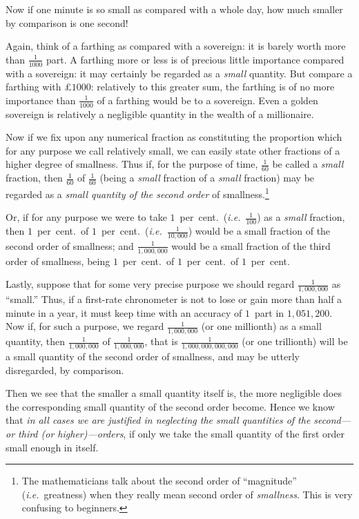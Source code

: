 \documentclass[12pt]{book}[2005/09/16]
\newcommand{\DPPageSep}[2]{\Pagelabel{#2}}
\newcommand{\Pagelabel}[1]
  {\phantomsection\label{#1}}
\newcommand{\IE}{\textit{i.e.}}
\begin{document}
Now if one minute is so small as compared with a
whole day, how much smaller by comparison is one
second!

Again, think of a farthing as compared with a
sovereign: it is barely worth more than $\frac{1}{1000}$ part.
A farthing more or less is of precious little importance
compared with a sovereign: it may certainly be regarded
as a \emph{small} quantity. But compare a farthing
with £$1000$: relatively to this greater sum, the
farthing is of no more importance than $\frac{1}{1000}$ of a
farthing would be to a sovereign. Even a golden
sovereign is relatively a negligible quantity in the
wealth of a millionaire.

Now if we fix upon any numerical fraction as
constituting the proportion which for any purpose
we call relatively small, we can easily state other
fractions of a higher degree of smallness. Thus if,
for the purpose of time, $\frac{1}{60}$ be called a \emph{small} fraction,
then $\frac{1}{60}$ of $\frac{1}{60}$ (being a \emph{small} fraction of a \emph{small}
fraction) may be regarded as a \emph{small quantity of the
second order}\Pagelabel{smallness} of smallness.\footnote
  {The mathematicians talk about the second order of ``magnitude''
  (\IE~greatness) when they really mean second order of \emph{smallness}.
  This is very confusing to beginners.}

Or, if for any purpose we were to take $1$~per~cent.\
(\IE~$\frac{1}{100}$) as a \emph{small} fraction, then $1$~per~cent.\ of
$1$~per~cent.\ (\IE~$\frac{1}{10,000}$) would be a small fraction
of the second order of smallness; and $\frac{1}{1,000,000}$ would
\DPPageSep{017.png}{5}%
be a small fraction of the third order of smallness,
being $1$~per~cent.\ of $1$~per~cent.\ of $1$~per~cent.

Lastly, suppose that for some very precise purpose
we should regard $\frac{1}{1,000,000}$ as ``small.'' Thus, if a
first-rate chronometer is not to lose or gain more than
half a minute in a year, it must keep time with an
accuracy of $1$~part in $1,051,200$. Now if, for such a
purpose, we regard $\frac{1}{1,000,000}$ (or one millionth) as a
small quantity, then $\frac{1}{1,000,000}$ of $\frac{1}{1,000,000}$, that is
$\frac{1}{1,000,000,000,000}$ (or one trillionth) will be a small
quantity of the second order of smallness, and may
be utterly disregarded, by comparison.

Then we see that the smaller a small quantity itself
is, the more negligible does the corresponding small
quantity of the second order become. Hence we
know that \emph{in all cases we are justified in neglecting
the small quantities of the second---or third \emph{(or
higher)}---orders}, if only we take the small quantity
of the first order small enough in itself.
\end{document}
